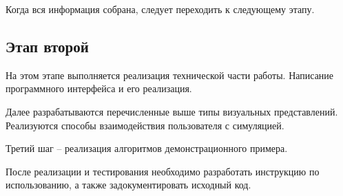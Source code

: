 Когда вся информация собрана, следует переходить к следующему этапу.

\subsection{Этап второй}

На этом этапе выполняется реализация технической части работы. Написание программного
интерфейса и его реализация. 

Далее разрабатываются перечисленные выше типы визуальных представлений. Реализуются
способы взаимодействия пользователя с симуляцией.

Третий шаг -- реализация алгоритмов демонстрационного примера.

После реализации и тестирования необходимо разработать инструкцию по использованию, а
также задокументировать исходный код.

